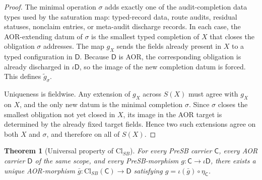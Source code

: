 \documentclass[11pt]{article}
\newcommand{\ClSB}{\mathrm{Cl}_{SB}}
\newtheorem{theorem}{Theorem}[section]
\theoremstyle{definition}
\begin{document}
\begin{proof}
The minimal operation \(\sigma\) adds exactly one of the audit-completion
data types used by the saturation map: typed-record data, route audits,
residual statuses, nonclaim entries, or meta-audit discharge records.  In
each case, the AOR-extending datum of \(\sigma\) is the smallest typed
completion of \(X\) that closes the obligation \(\sigma\) addresses.  The
map \(g_X\) sends the fields already present in \(X\) to a typed
configuration in \(\mathsf D\).  Because \(\mathsf D\) is AOR, the
corresponding obligation is already discharged in \(\iota\mathsf D\), so
the image of the new completion datum is forced.  This defines
\(\widetilde g_\sigma\).

Uniqueness is fieldwise.  Any extension of \(g_X\) across \(S(X)\) must
agree with \(g_X\) on \(X\), and the only new datum is the minimal
completion \(\sigma\).  Since \(\sigma\) closes the smallest obligation
not yet closed in \(X\), its image in the AOR target is determined by
the already fixed target fields.  Hence two such extensions agree on
both \(X\) and \(\sigma\), and therefore on all of \(S(X)\).
\end{proof}

\begin{theorem}[Universal property of $\ClSB$]\label{thm:aor:cl-sb-universal-property}
For every PreSB carrier $\mathsf C$, every AOR carrier $\mathsf D$ of
the same scope, and every PreSB-morphism $g:\mathsf C\to\iota\mathsf D$,
there exists a unique AOR-morphism
$\bar g:\ClSB(\mathsf C)\to\mathsf D$
satisfying $g = \iota(\bar g)\circ\eta_{\mathsf C}$.
\end{theorem}
\end{document}
